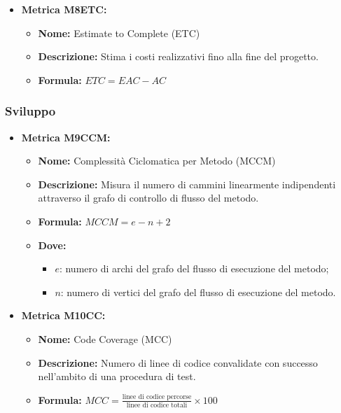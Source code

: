 \begin{itemize}
    \item \textbf{Metrica M8ETC:}
          \begin{itemize}
              \item \textbf{Nome:} Estimate to Complete (ETC)
              \item \textbf{Descrizione:} Stima i costi realizzativi fino alla fine del progetto.
              \item \textbf{Formula:} $ETC = EAC - AC$
          \end{itemize}
\end{itemize}


\subsubsection{Sviluppo}
\begin{itemize}
    \item \textbf{Metrica M9CCM:}
          \begin{itemize}
              \item \textbf{Nome:} Complessità Ciclomatica per Metodo (MCCM)
              \item \textbf{Descrizione:} Misura il numero di cammini linearmente indipendenti attraverso il grafo di controllo di flusso del metodo.
              \item \textbf{Formula:} $MCCM = e - n + 2$
              \item \textbf{Dove:}
                    \begin{itemize}
                        \item $e$: numero di archi del grafo del flusso di esecuzione del metodo;
                        \item $n$: numero di vertici del grafo del flusso di esecuzione del metodo.
                    \end{itemize}
          \end{itemize}

    \item \textbf{Metrica M10CC:}
          \begin{itemize}
              \item \textbf{Nome:} Code Coverage (MCC)
              \item \textbf{Descrizione:} Numero di linee di codice convalidate con successo nell'ambito di una procedura di test.
              \item \textbf{Formula:} $MCC = \frac{\text{linee di codice percorse}}{\text{linee di codice totali}} \times 100$
          \end{itemize}


\end{itemize}

